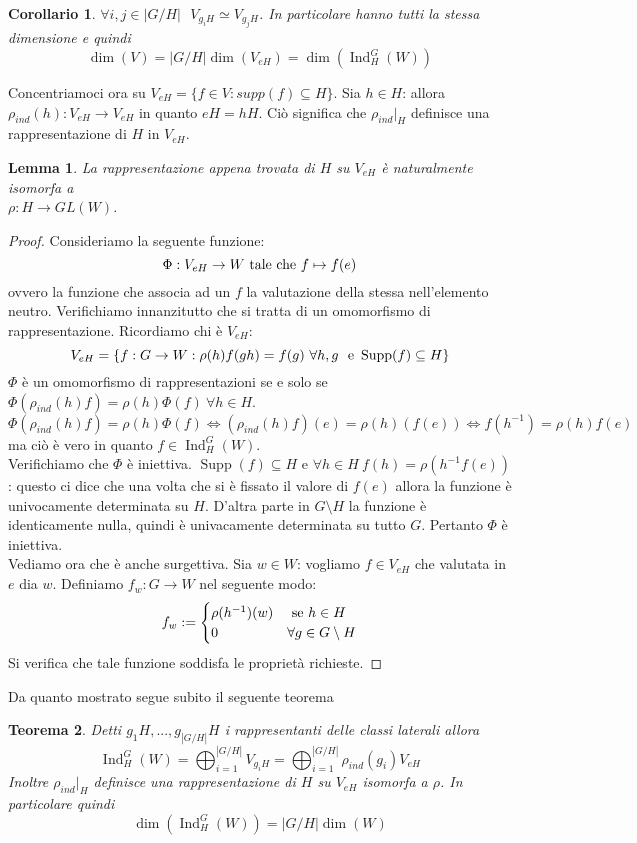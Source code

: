 \documentclass[11pt]{article}
\theoremstyle{plain}
\newtheorem{thm}{Teorema}[section]
\newtheorem{lemma}[thm]{Lemma}
\newtheorem*{cor}{Corollario}
\theoremstyle{definition}
\theoremstyle{remark}
\DeclareMathOperator{\Supp}{Supp}
\DeclareMathOperator{\Ind}{Ind}
\DeclareMathOperator{\iso}{\simeq}
\begin{document}
\begin{cor}
$\forall i,j\in |G/H|\ \ \ V_{g_iH}\iso V_{g_jH}$.
In particolare hanno tutti la stessa dimensione e quindi
\[\dim(V)=|G/H|\dim(V_{eH})=\dim(\Ind_H^G(W))\]
\end{cor}

Concentriamoci ora su $V_{eH}=\{f\in V:supp(f)\subseteq H\}$. Sia $h\in H$: allora $\rho_{ind}(h):V_{eH}\rightarrow V_{eH}$ in quanto $eH=hH$. Ciò significa che $\rho_{ind}|_{H}$ definisce una rappresentazione di $H$ in $V_{eH}$.
\begin{lemma}
La rappresentazione appena trovata di $H$ su $V_{eH}$ è naturalmente isomorfa a\\ $\rho:H\rightarrow GL(W)$.
\end{lemma}

\begin{proof} Consideriamo la seguente funzione:
\[\Phi:V_{eH}\rightarrow W\ \textup{tale che } f\mapsto f(e)\]
ovvero la funzione che associa ad un $f$ la valutazione della stessa nell'elemento neutro. Verifichiamo innanzitutto che si tratta di un omomorfismo di rappresentazione. Ricordiamo chi è $V_{eH}$:
\[V_{eH}=\{f:G\rightarrow W: \rho(h)f(gh)=f(g)\ \forall h,g\ \ \textup{e } \Supp(f)\subseteq H\}\]
$\Phi$ è un omomorfismo di rappresentazioni se e solo se $\Phi(\rho_{ind}(h)f)=\rho(h)\Phi(f)\ \forall h\in H$.
\[\Phi(\rho_{ind}(h)f)=\rho(h)\Phi(f) \Leftrightarrow (\rho_{ind}(h)f)(e)=\rho(h)(f(e))\Leftrightarrow f(h^{-1})=\rho(h)f(e)\]
ma ciò è vero in quanto $f\in \Ind_H^G(W)$. \\
Verifichiamo che $\Phi$ è iniettiva. $\Supp(f)\subseteq H$ e $\forall h\in H\ f(h)=\rho(h^{-1}f(e))$: questo ci dice che una volta che si è fissato il valore di $f(e)$ allora la funzione è univocamente determinata su $H$. D'altra parte in $G\setminus H$ la funzione è identicamente nulla, quindi è univacamente determinata su tutto $G$. Pertanto $\Phi$ è iniettiva.\\
Vediamo ora che è anche surgettiva. Sia $w\in W$: vogliamo $f\in V_{eH}$ che valutata in $e$ dia $w$. Definiamo $f_w:G\rightarrow W$ nel seguente modo:
\[f_w:=\begin{cases}
\rho(h^{-1})(w)& \textup{ se } h\in H\\
0& \forall g\in G\setminus H
\end{cases}\]
Si verifica che tale funzione soddisfa le proprietà richieste.
\end{proof}


Da quanto mostrato segue subito il seguente teorema
\begin{thm} Detti $g_1H,...,g_{|G/H|}H$ i rappresentanti delle classi laterali allora
\[\Ind_H^G(W)= \bigoplus_{i=1}^{|G/H|} V_{g_iH} = \bigoplus_{i=1}^{|G/H|}\rho_{ind}(g_i)V_{eH} \]
Inoltre $\rho_{ind}|_H$ definisce una rappresentazione di $H$ su $V_{eH}$ isomorfa a $\rho$. In particolare quindi
\[\dim(\Ind_H^G(W))=|G/H|\dim(W)\]
\end{thm}
\end{document}

